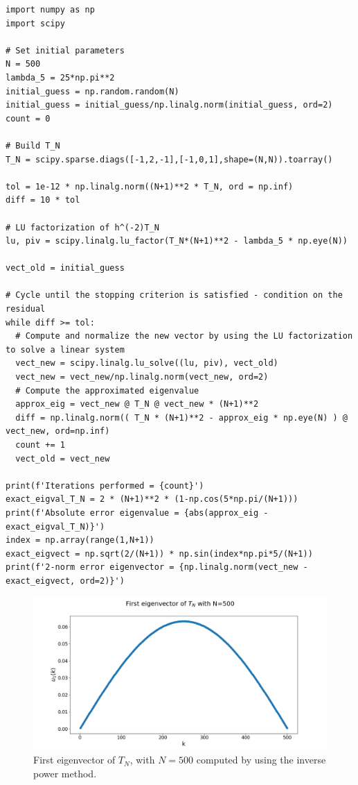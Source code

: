 \documentclass[a4paper,11pt]{article}
\begin{document}
\begin{verbatim}
import numpy as np
import scipy

# Set initial parameters
N = 500
lambda_5 = 25*np.pi**2
initial_guess = np.random.random(N)
initial_guess = initial_guess/np.linalg.norm(initial_guess, ord=2)
count = 0

# Build T_N
T_N = scipy.sparse.diags([-1,2,-1],[-1,0,1],shape=(N,N)).toarray()

tol = 1e-12 * np.linalg.norm((N+1)**2 * T_N, ord = np.inf)
diff = 10 * tol

# LU factorization of h^(-2)T_N
lu, piv = scipy.linalg.lu_factor(T_N*(N+1)**2 - lambda_5 * np.eye(N))

vect_old = initial_guess

# Cycle until the stopping criterion is satisfied - condition on the residual
while diff >= tol:
  # Compute and normalize the new vector by using the LU factorization to solve a linear system
  vect_new = scipy.linalg.lu_solve((lu, piv), vect_old)  
  vect_new = vect_new/np.linalg.norm(vect_new, ord=2)
  # Compute the approximated eigenvalue
  approx_eig = vect_new @ T_N @ vect_new * (N+1)**2
  diff = np.linalg.norm(( T_N * (N+1)**2 - approx_eig * np.eye(N) ) @ vect_new, ord=np.inf)
  count += 1
  vect_old = vect_new

print(f'Iterations performed = {count}')
exact_eigval_T_N = 2 * (N+1)**2 * (1-np.cos(5*np.pi/(N+1)))
print(f'Absolute error eigenvalue = {abs(approx_eig - exact_eigval_T_N)}')
index = np.array(range(1,N+1))
exact_eigvect = np.sqrt(2/(N+1)) * np.sin(index*np.pi*5/(N+1))
print(f'2-norm error eigenvector = {np.linalg.norm(vect_new - exact_eigvect, ord=2)}')
\end{verbatim}


\begin{figure}[H]
	\centering
	\includegraphics[scale=0.40]{Plot/First_eigvect_tn_n=500.png}
	\caption{First eigenvector of $T_{N}$, with $N=500$ computed by using the inverse power method.}
	\label{Fig:First_eigvect_Tn}
\end{figure}
\end{document}
